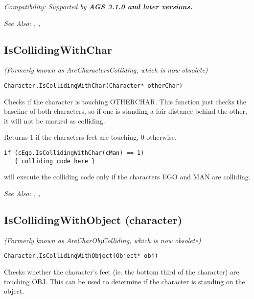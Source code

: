 \it{Compatibility:} Supported by \bf{AGS 3.1.0} and later versions.

\it{See Also:} ,
,



\subsection{IsCollidingWithChar}\label{Character.IsCollidingWithChar}%

\it{(Formerly known as AreCharactersColliding, which is now obsolete)}

\begin{verbatim}
Character.IsCollidingWithChar(Character* otherChar)
\end{verbatim}
Checks if the character is touching OTHERCHAR. This function just checks
the baseline of both characters, so if one is standing a fair distance behind
the other, it will not be marked as colliding.

Returns 1 if the characters feet are touching, 0 otherwise.

\begin{verbatim}
if (cEgo.IsCollidingWithChar(cMan) == 1)
   { colliding code here }
\end{verbatim}
will execute the colliding code only if the characters EGO and MAN are colliding.

\it{See Also:} ,
,


\subsection{IsCollidingWithObject (character)}\label{Character.IsCollidingWithObject}%

\it{(Formerly known as AreCharObjColliding, which is now obsolete)}

\begin{verbatim}
Character.IsCollidingWithObject(Object* obj)
\end{verbatim}
Checks whether the character's feet (ie. the bottom third of the character) are
touching OBJ. This can be used to determine if the character is standing on the object.

